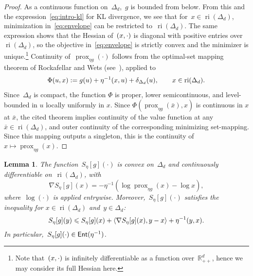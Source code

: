 \documentclass[11pt]{article}
\numberwithin{equation}{section}
\let\le\leqslant
\newtheorem{lemma}[theorem]{Lemma}
\theoremstyle{remark}
\newcommand{\R}{\mathbb{R}}
\newcommand{\ones}{\mathsf{1}_d}
\newcommand{\ri}{\operatorname{ri}}
\newcommand{\Env}{S}
\newcommand{\Ent}{\textup{\textsf{Ent}}}
\let\Div\relax\newcommand{\Div}{D_h}
\newcommand{\Simp}{\Delta_d}
\newcommand{\prox}{\operatorname{prox}}
\newcommand{\1}{\mathbf{1}}
\newcommand{\bnabla}{\nabla}
\begin{document}
\begin{proof}
As a continuous function on~$\Simp$,~$g$ is bounded from below.
From this and the expression~\eqref{eq:intro-kl} for KL divergence, we see that for~$x \in \ri(\Simp)$, minimization in~\eqref{eq:envelope} can be restricted to~$\ri(\Simp)$.
The same expression shows that the Hessian of~$\Div(x,\cdot)$ is diagonal with positive entries over~$\ri(\Simp)$, so the objective in~\eqref{eq:envelope} is strictly convex and the minimizer is unique.\footnote{Note that~$\Div(x,\cdot)$ is infinitely differentiable as a function over~$\R^d_{++}$, hence we may consider its full Hessian here.}
Continuity of~$\prox_{\eta g}(\cdot)$ follows from the optimal-set mapping theorem of Rockafellar and Wets (see~\cite[Example~5.22]{rockafellar1998variational}), applied to
\[
        \Phi(u,x)
        :=
        g(u)+\eta^{-1}\Div(x,u)+\delta_{\Simp}(u),
        \qquad x\in\ri(\Simp).
\]
Since~$\Simp$ is compact, the function $\Phi$ is proper, lower semicontinuous, and level-bounded in $u$ locally uniformly in $x$.
Since $\Phi(\prox_{\eta g}(\bar x),x)$ is continuous in $x$ at $\bar x$, the cited theorem implies continuity of the value function at any~$\bar x\in\ri(\Simp)$, and outer continuity of the corresponding minimizing set-mapping.
Since this mapping outputs a singleton, this is the continuity of~$x \mapsto \prox_{\eta g}(x)$.
\end{proof}

\begin{lemma}
\label{lem:envelope-regularity}
The function~$\Env_\eta[g](\cdot)$ is convex on~$\Simp$ and continuously differentiable on~$\ri(\Simp)$, with
\begin{equation}
\label{eq:right-bm-prox-identity}
    \bnabla \Env_\eta[g](x)
    =
    -\eta^{-1}(\log\prox_{\eta g}(x) - \log x),
\end{equation}
where~$\log(\cdot)$ is applied entrywise. 
Moreover,~$\Env_\eta[g](\cdot)$ satisfies the inequality for $x \in \ri(\Simp)$ and~$y \in \Simp$:
\begin{equation}
\label{eq:right-bm-relative-smoothness}
    \Env_\eta[g](y)
    \le
    \Env_\eta[g](x)
    +\left\langle \nabla \Env_\eta[g](x),y-x\right\rangle
    +\eta^{-1}\Div(y,x).
\end{equation}
In particular,~$\Env_\eta[g](\cdot) \in \Ent(\eta^{-1})$. 
\end{lemma}
\end{document}
